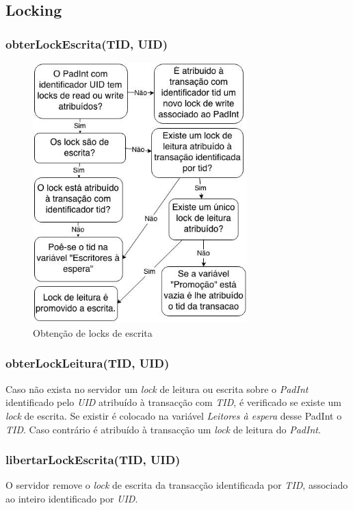 \subsection{Locking}

\subsubsection{obterLockEscrita(TID, UID)}

\begin{figure}[H]
\centering
\includegraphics[width=8.25cm]{obtem_lock_w.jpg}
\caption{Obtenção de locks de escrita}
\end{figure}

\subsubsection{obterLockLeitura(TID, UID)}

Caso não exista no servidor um \textit{lock} de leitura ou escrita sobre o \textit{PadInt} identificado pelo \textit{UID} atribuído à transacção com \textit{TID}, é verificado se existe um \textit{lock} de escrita. Se existir é colocado na variável \textit{Leitores à espera} desse PadInt o \textit{TID}. Caso contrário é atribuído à transacção um \textit{lock} de leitura do \textit{PadInt}.

\subsubsection{libertarLockEscrita(TID, UID)}

O servidor remove o \textit{lock} de escrita da transacção identificada por \textit{TID}, associado ao inteiro identificado por \textit{UID}.

